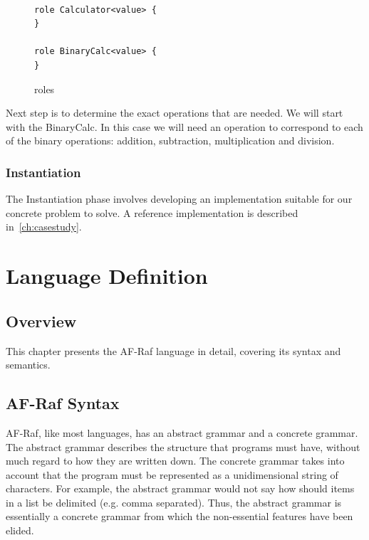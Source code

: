 \documentclass[a4paper,12pt,oneside,fleqn]{book} %
\newcommand{\todo}[1]{[\textcolor{red}{TODO}: #1]}
\begin{document}
\begin{figure}\footnotesize %
\begin{verbatim}

role Calculator<value> {
}

role BinaryCalc<value> {
}

\end{verbatim}
\caption{roles}
\label{fig:c-roles}
\end{figure} %

Next step is to determine the exact operations that are needed. We will
start with the BinaryCalc. In this case we will need an operation to
correspond to each of the binary operations: addition, subtraction,
multiplication and division.


\subsection{Instantiation} %
The Instantiation phase involves developing an implementation suitable for
our concrete problem to solve. A reference implementation is described
in~\autoref{ch:casestudy}.


\chapter{Language Definition}\label{ch:langdef} %


\section{Overview}\label{sec:langdef.overview} %

This chapter presents the AF-Raf language in detail, covering its syntax
and semantics.

\section{AF-Raf Syntax}\label{sec:langdef.syntax} %

AF-Raf, like most languages, has an abstract grammar and a concrete
grammar. The abstract grammar describes the structure that programs must
have, without much regard to how they are written down. The concrete
grammar takes into account that the program must be represented as a
unidimensional string of characters. For example, the abstract grammar
would not say how should items in a list be delimited (e.g. comma
separated). Thus, the abstract grammar is essentially a concrete grammar
from which the non-essential features have been elided.
\end{document}
